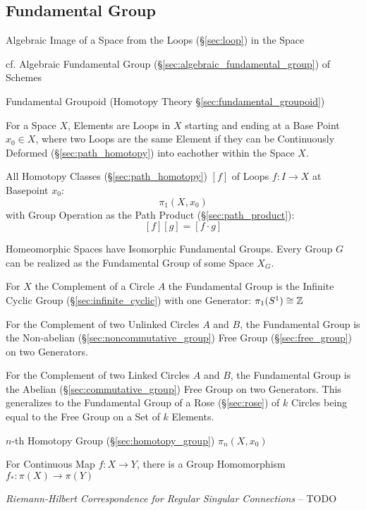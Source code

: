 \subsection{Fundamental Group}\label{sec:fundamental_group}

Algebraic Image of a Space from the Loops (\S\ref{sec:loop}) in the
Space

cf. Algebraic Fundamental Group (\S\ref{sec:algebraic_fundamental_group}) of
Schemes

\fist Fundamental Groupoid (Homotopy Theory \S\ref{sec:fundamental_groupoid})

For a Space $X$, Elements are Loops in $X$ starting and ending at a
Base Point $x_0 \in X$, where two Loops are the same Element if they
can be Continuously Deformed (\S\ref{sec:path_homotopy}) into
eachother within the Space $X$.

All Homotopy Classes (\S\ref{sec:path_homotopy}) $[f]$ of Loops $f : I
\rightarrow X$ at Basepoint $x_0$:
\[
  \pi_1(X,x_0)
\]
with Group Operation as the Path Product (\S\ref{sec:path_product}):
\[
  [f][g] = [f \cdot g]
\]

Homeomorphic Spaces have Isomorphic Fundamental Groups. Every Group
$G$ can be realized as the Fundamental Group of some Space $X_G$.
\cite{hatcher02}

For $X$ the Complement of a Circle $A$ the Fundamental Group is the
Infinite Cyclic Group (\S\ref{sec:infinite_cyclic}) with one
Generator: $\pi_1(S^1) \cong \mathbb{Z}$

For the Complement of two Unlinked Circles $A$ and $B$, the
Fundamental Group is the Non-abelian (\S\ref{sec:noncommutative_group})
Free Group (\S\ref{sec:free_group}) on two Generators.

For the Complement of two Linked Circles $A$ and $B$, the Fundamental
Group is the Abelian (\S\ref{sec:commutative_group}) Free Group on two
Generators. \cite{hatcher02} This generalizes to the Fundamental Group
of a Rose (\S\ref{sec:rose}) of $k$ Circles being equal to the Free
Group on a Set of $k$ Elements.

$n$-th Homotopy Group (\S\ref{sec:homotopy_group}) $\pi_n(X,x_0)$

For Continuous Map $f : X \rightarrow Y$, there is a Group
Homomorphism $f_* : \pi (X) \rightarrow \pi (Y)$


\emph{Riemann-Hilbert Correspondence for Regular Singular Connections} -- TODO



